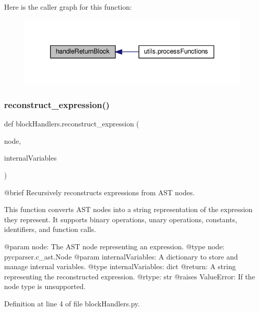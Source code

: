 Here is the caller graph for this function\+:\nopagebreak
\begin{figure}[H]
\begin{center}
\leavevmode
\includegraphics[width=330pt]{namespaceblockHandlers_a9a619208834c3d0aa0861354376f5208_icgraph}
\end{center}
\end{figure}
\mbox{\label{namespaceblockHandlers_a5dcb5985c58176982a44686f616daa7f}} 
\subsubsection{\texorpdfstring{reconstruct\+\_\+expression()}{reconstruct\_expression()}}
{\footnotesize\ttfamily def block\+Handlers.\+reconstruct\+\_\+expression (\begin{DoxyParamCaption}\item[{}]{node,  }\item[{}]{internal\+Variables }\end{DoxyParamCaption})}

\begin{DoxyVerb}@brief Recursively reconstructs expressions from AST nodes.

This function converts AST nodes into a string representation of the expression they represent. It supports binary operations, unary operations, constants, identifiers, and function calls.

@param node: The AST node representing an expression.
@type node: pycparser.c_ast.Node
@param internalVariables: A dictionary to store and manage internal variables.
@type internalVariables: dict
@return: A string representing the reconstructed expression.
@rtype: str
@raises ValueError: If the node type is unsupported.
\end{DoxyVerb}
 

Definition at line 4 of file block\+Handlers.\+py.


